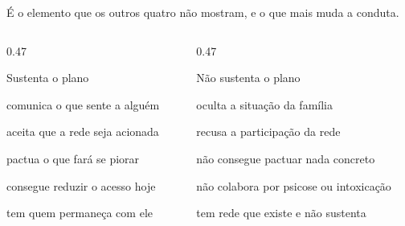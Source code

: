 \begin{frame}{}
{\small \'E o elemento que os outros quatro n\~ao mostram, e o que mais muda a
conduta.\par}

\CRvg
\begin{columns}[onlytextwidth, t]
\begin{column}{0.47\textwidth}
\begin{caixaproteger}{Sustenta o plano}
\begin{itemc}
\item comunica o que sente a algu\'em
\item aceita que a rede seja acionada
\item pactua o que far\'a se piorar
\item consegue reduzir o acesso hoje
\item tem quem permane\c{c}a com ele
\end{itemc}
\end{caixaproteger}
\end{column}
\calha
\begin{column}{0.47\textwidth}
\begin{caixaagir}{N\~ao sustenta o plano}
\begin{itemc}
\item oculta a situa\c{c}\~ao da fam\'ilia
\item recusa a participa\c{c}\~ao da rede
\item n\~ao consegue pactuar nada concreto
\item n\~ao colabora por psicose ou intoxica\c{c}\~ao
\item tem rede que existe e n\~ao sustenta
\end{itemc}
\end{caixaagir}
\end{column}
\end{columns}

\end{frame}

